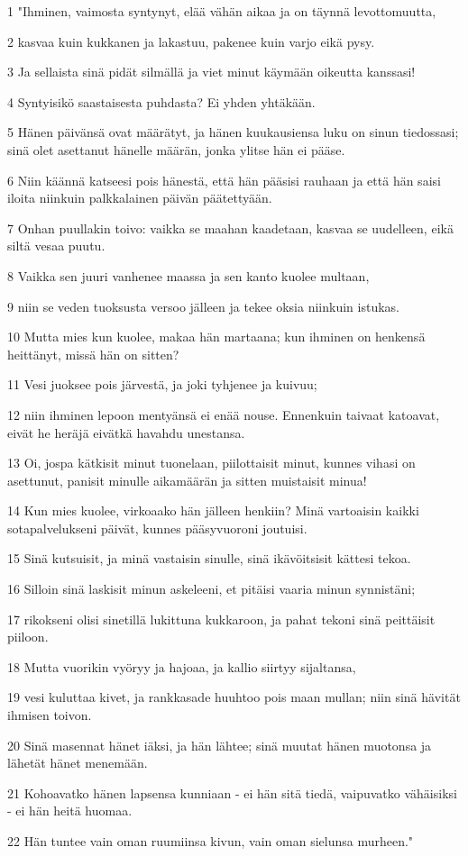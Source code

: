 \par 1 "Ihminen, vaimosta syntynyt, elää vähän aikaa ja on täynnä levottomuutta,
\par 2 kasvaa kuin kukkanen ja lakastuu, pakenee kuin varjo eikä pysy.
\par 3 Ja sellaista sinä pidät silmällä ja viet minut käymään oikeutta kanssasi!
\par 4 Syntyisikö saastaisesta puhdasta? Ei yhden yhtäkään.
\par 5 Hänen päivänsä ovat määrätyt, ja hänen kuukausiensa luku on sinun tiedossasi; sinä olet asettanut hänelle määrän, jonka ylitse hän ei pääse.
\par 6 Niin käännä katseesi pois hänestä, että hän pääsisi rauhaan ja että hän saisi iloita niinkuin palkkalainen päivän päätettyään.
\par 7 Onhan puullakin toivo: vaikka se maahan kaadetaan, kasvaa se uudelleen, eikä siltä vesaa puutu.
\par 8 Vaikka sen juuri vanhenee maassa ja sen kanto kuolee multaan,
\par 9 niin se veden tuoksusta versoo jälleen ja tekee oksia niinkuin istukas.
\par 10 Mutta mies kun kuolee, makaa hän martaana; kun ihminen on henkensä heittänyt, missä hän on sitten?
\par 11 Vesi juoksee pois järvestä, ja joki tyhjenee ja kuivuu;
\par 12 niin ihminen lepoon mentyänsä ei enää nouse. Ennenkuin taivaat katoavat, eivät he heräjä eivätkä havahdu unestansa.
\par 13 Oi, jospa kätkisit minut tuonelaan, piilottaisit minut, kunnes vihasi on asettunut, panisit minulle aikamäärän ja sitten muistaisit minua!
\par 14 Kun mies kuolee, virkoaako hän jälleen henkiin? Minä vartoaisin kaikki sotapalvelukseni päivät, kunnes pääsyvuoroni joutuisi.
\par 15 Sinä kutsuisit, ja minä vastaisin sinulle, sinä ikävöitsisit kättesi tekoa.
\par 16 Silloin sinä laskisit minun askeleeni, et pitäisi vaaria minun synnistäni;
\par 17 rikokseni olisi sinetillä lukittuna kukkaroon, ja pahat tekoni sinä peittäisit piiloon.
\par 18 Mutta vuorikin vyöryy ja hajoaa, ja kallio siirtyy sijaltansa,
\par 19 vesi kuluttaa kivet, ja rankkasade huuhtoo pois maan mullan; niin sinä hävität ihmisen toivon.
\par 20 Sinä masennat hänet iäksi, ja hän lähtee; sinä muutat hänen muotonsa ja lähetät hänet menemään.
\par 21 Kohoavatko hänen lapsensa kunniaan - ei hän sitä tiedä, vaipuvatko vähäisiksi - ei hän heitä huomaa.
\par 22 Hän tuntee vain oman ruumiinsa kivun, vain oman sielunsa murheen."

